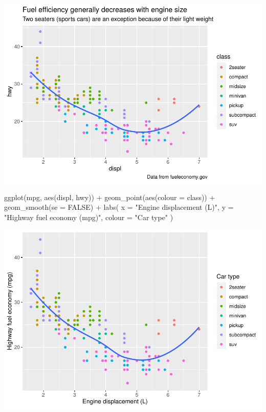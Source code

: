 \documentclass[
]{article}
\newenvironment{Shaded}{\begin{snugshade}}{\end{snugshade}}
\newcommand{\AttributeTok}[1]{\textcolor[rgb]{0.77,0.63,0.00}{#1}}
\newcommand{\ConstantTok}[1]{\textcolor[rgb]{0.00,0.00,0.00}{#1}}
\newcommand{\FunctionTok}[1]{\textcolor[rgb]{0.00,0.00,0.00}{#1}}
\newcommand{\NormalTok}[1]{#1}
\newcommand{\SpecialCharTok}[1]{\textcolor[rgb]{0.00,0.00,0.00}{#1}}
\newcommand{\StringTok}[1]{\textcolor[rgb]{0.31,0.60,0.02}{#1}}
\begin{document}
\includegraphics{Journal_files/figure-latex/unnamed-chunk-51-2.pdf}

\begin{Shaded}
\begin{Highlighting}[]
\FunctionTok{ggplot}\NormalTok{(mpg, }\FunctionTok{aes}\NormalTok{(displ, hwy)) }\SpecialCharTok{+}
  \FunctionTok{geom\_point}\NormalTok{(}\FunctionTok{aes}\NormalTok{(}\AttributeTok{colour =}\NormalTok{ class)) }\SpecialCharTok{+}
  \FunctionTok{geom\_smooth}\NormalTok{(}\AttributeTok{se =} \ConstantTok{FALSE}\NormalTok{) }\SpecialCharTok{+}
  \FunctionTok{labs}\NormalTok{(}
    \AttributeTok{x =} \StringTok{"Engine displacement (L)"}\NormalTok{,}
    \AttributeTok{y =} \StringTok{"Highway fuel economy (mpg)"}\NormalTok{,}
    \AttributeTok{colour =} \StringTok{"Car type"}
\NormalTok{  )}
\end{Highlighting}
\end{Shaded}

\includegraphics{Journal_files/figure-latex/unnamed-chunk-51-3.pdf}
\end{document}
